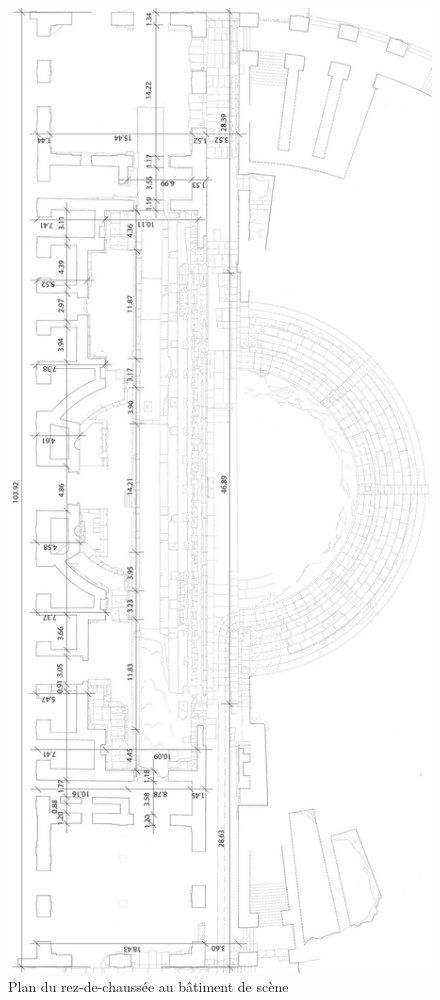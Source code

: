 \begin{figure}[!h]
	\includegraphics[height=0.8\paperheight]{images/cotes}
	\caption[Plan du rez-de-chaussée au bâtiment de scène]{Plan du rez-de-chaussée au bâtiment de scène \cite[Pl. XXI]{orangePl}}
	\label{cotes} 
\end{figure} 
		
